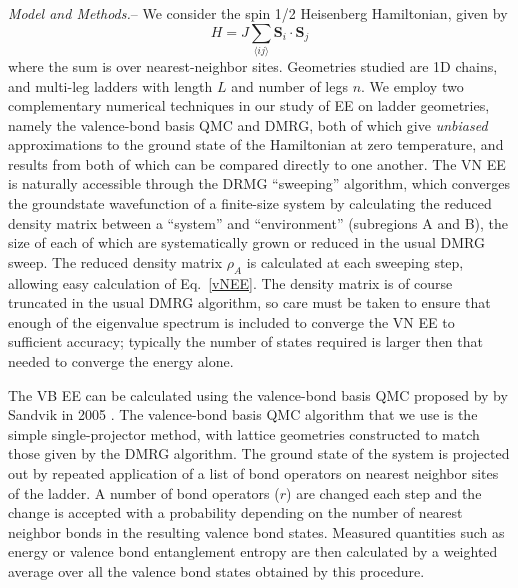 \documentclass[prl,aps,twocolumn,floatfix,amsmath,amssymb,superscriptaddress,tightenlines]{revtex4}
\begin{document}
{\it Model and Methods.}-- We consider the spin 1/2 Heisenberg Hamiltonian, given by
\begin{equation}
H = J \sum_{\langle i j \rangle} {\mathbf S}_i \cdot {\mathbf S}_j \label{ham}
\end{equation}
where the sum is over nearest-neighbor sites.  Geometries studied are 1D chains, and multi-leg ladders with length $L$ and number of legs $n$.  
We employ two complementary numerical techniques in our study of EE on ladder geometries, namely the valence-bond basis QMC and DMRG, both of which give {\it unbiased} approximations to the ground state of the Hamiltonian at zero temperature, and results from both of which can be compared directly to one another.  
The VN EE is naturally accessible through the DRMG ``sweeping'' algorithm, which converges the groundstate wavefunction of a finite-size system by calculating the reduced density matrix between a ``system'' and ``environment'' (subregions A and B), the size of each of which are systematically grown or reduced in the usual DMRG sweep.  The reduced density matrix $\rho_A$ is calculated at each sweeping step, allowing easy calculation of Eq.~\ref{vNEE}.  The density matrix is of course truncated in the usual DMRG algorithm, so care must be taken to ensure that enough of the eigenvalue spectrum is included to converge the VN EE to sufficient accuracy; typically the number of states required is larger then that needed to converge the energy alone.

The VB EE can be calculated using the valence-bond basis QMC proposed by by Sandvik in 2005 \cite{Sandvik}.
The valence-bond basis QMC algorithm that we use is the simple single-projector method, with lattice geometries constructed to match those given by the DMRG algorithm.  The ground state of the system is projected out by repeated application of a list of bond operators on nearest neighbor sites of the ladder.  A number of bond operators ($r$) are changed each step and the change is accepted with a probability depending on the number of nearest neighbor bonds in the resulting valence bond states.  Measured quantities such as energy or valence bond entanglement entropy are then calculated by a weighted average over all the valence bond states obtained by this procedure.
\end{document}
